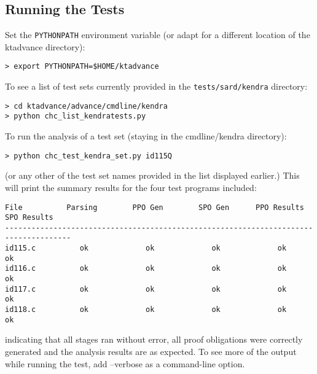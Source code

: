 \documentclass[11pt]{article}
\begin{document}
\subsection{Running the Tests}
\label{sec:runkendra}

Set the {\tt PYTHONPATH} environment variable (or adapt for a different location
of the ktadvance directory):
\begin{verbatim}
> export PYTHONPATH=$HOME/ktadvance
\end{verbatim}
To see a list of test sets currently provided in the {\tt tests/sard/kendra}
directory:
\begin{verbatim}
> cd ktadvance/advance/cmdline/kendra
> python chc_list_kendratests.py
\end{verbatim}
To run the analysis of a test set (staying in the cmdline/kendra directory):
\begin{verbatim}
> python chc_test_kendra_set.py id115Q
\end{verbatim}
(or any other of the test set names provided in the list displayed earlier.)
This will print the summary results for the four test programs included:
\begin{small}
\begin{verbatim}
File          Parsing        PPO Gen        SPO Gen      PPO Results    SPO Results  
-------------------------------------------------------------------------------------
id115.c          ok             ok             ok             ok             ok      
id116.c          ok             ok             ok             ok             ok      
id117.c          ok             ok             ok             ok             ok      
id118.c          ok             ok             ok             ok             ok      
\end{verbatim}
\end{small}

indicating that all stages ran without error, all proof obligations were correctly
generated and the analysis results are as expected. 
To see more of the output while running the test, add --verbose as a command-line option.
\end{document}
